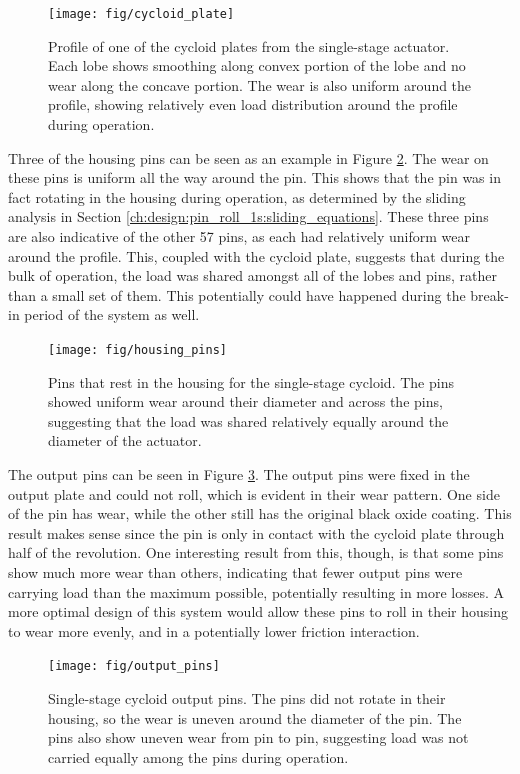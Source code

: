 \begin{figure}[!b]
   \centering
   \texttt{[image: fig/cycloid\_plate]}
   \caption{Profile of one of the cycloid plates from the single-stage actuator. Each lobe shows smoothing along convex portion of the lobe and no wear along the concave portion. The wear is also uniform around the profile, showing relatively even load distribution around the profile during operation.}
   \label{fig:cycloid_plate}
\end{figure}


Three of the housing pins can be seen as an example in Figure \ref{fig:single_housing_pins}. The wear on these pins is uniform all the way around the pin. This shows that the pin was in fact rotating in the housing during operation, as determined by the sliding analysis in Section \ref{ch:design:pin_roll_1s:sliding_equations}. These three pins are also indicative of the other 57 pins, as each had relatively uniform wear around the profile. This, coupled with the cycloid plate, suggests that during the bulk of operation, the load was shared amongst all of the lobes and pins, rather than a small set of them. This potentially could have happened during the break-in period of the system as well. 

\begin{figure}[t]
   \centering
   \texttt{[image: fig/housing\_pins]}
   \caption{Pins that rest in the housing for the single-stage cycloid. The pins showed uniform wear around their diameter and across the pins, suggesting that the load was shared relatively equally around the diameter of the actuator.}
   \label{fig:single_housing_pins}
\end{figure}


The output pins can be seen in Figure \ref{fig:single_output_pins}. The output pins were fixed in the output plate and could not roll, which is evident in their wear pattern. One side of the pin has wear, while the other still has the original black oxide coating. This result makes sense since the pin is only in contact with the cycloid plate through half of the revolution. One interesting result from this, though, is that some pins show much more wear than others, indicating that fewer output pins were carrying load than the maximum possible, potentially resulting in more losses. A more optimal design of this system would allow these pins to roll in their housing to wear more evenly, and in a potentially lower friction interaction. 

\begin{figure}[!b]
   \centering
   \texttt{[image: fig/output\_pins]}
   \caption{Single-stage cycloid output pins. The pins did not rotate in their housing, so the wear is uneven around the diameter of the pin. The pins also show uneven wear from pin to pin, suggesting load was not carried equally among the pins during operation.}
   \label{fig:single_output_pins}
\end{figure}

